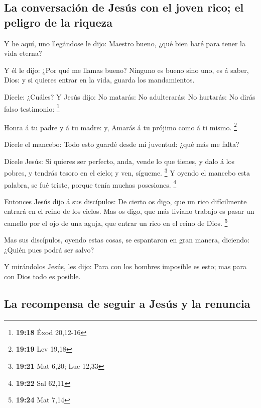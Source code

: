 \hypertarget{la-conversaciuxf3n-de-jesuxfas-con-el-joven-rico-el-peligro-de-la-riqueza}{%
\subsection{La conversación de Jesús con el joven rico; el peligro de la
riqueza}\label{la-conversaciuxf3n-de-jesuxfas-con-el-joven-rico-el-peligro-de-la-riqueza}}

 Y he aquí, uno llegándose le dijo: Maestro bueno, ¿qué
bien haré para tener la vida eterna?

 Y él le dijo: ¿Por qué me llamas bueno? Ninguno es bueno
sino uno, es á saber, Dios: y si quieres entrar en la vida, guarda los
mandamientos.

 Dícele: ¿Cuáles? Y Jesús dijo: No matarás: No adulterarás:
No hurtarás: No dirás falso testimonio: \footnote{\textbf{19:18} Éxod
  20,12-16}

 Honra á tu padre y á tu madre: y, Amarás á tu prójimo como
á ti mismo. \footnote{\textbf{19:19} Lev 19,18}

 Dícele el mancebo: Todo esto guardé desde mi juventud:
¿qué más me falta?

 Dícele Jesús: Si quieres ser perfecto, anda, vende lo que
tienes, y dalo á los pobres, y tendrás tesoro en el cielo; y ven,
sígueme. \footnote{\textbf{19:21} Mat 6,20; Luc 12,33}  Y
oyendo el mancebo esta palabra, se fué triste, porque tenía muchas
posesiones. \footnote{\textbf{19:22} Sal 62,11}

 Entonces Jesús dijo á sus discípulos: De cierto os digo,
que un rico difícilmente entrará en el reino de los cielos.
 Mas os digo, que más liviano trabajo es pasar un camello
por el ojo de una aguja, que entrar un rico en el reino de Dios.
\footnote{\textbf{19:24} Mat 7,14}

 Mas sus discípulos, oyendo estas cosas, se espantaron en
gran manera, diciendo: ¿Quién pues podrá ser salvo?

 Y mirándolos Jesús, les dijo: Para con los hombres
imposible es esto; mas para con Dios todo es posible.

\hypertarget{la-recompensa-de-seguir-a-jesuxfas-y-la-renuncia}{%
\subsection{La recompensa de seguir a Jesús y la
renuncia}\label{la-recompensa-de-seguir-a-jesuxfas-y-la-renuncia}}

